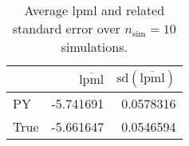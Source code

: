 \begin{table}[H]

\caption{Average lpml and related standard error over $n_{\text{sim}} = 10$ simulations.}
\centering
\begin{tabular}[t]{lrr}
\toprule
  & $\overbar{\text{lpml}}$ & $\text{sd}(\overbar{\text{lpml}})$\\
\midrule
PY & -5.741691 & 0.0578316\\
True & -5.661647 & 0.0546594\\
\bottomrule
\end{tabular}
\end{table}